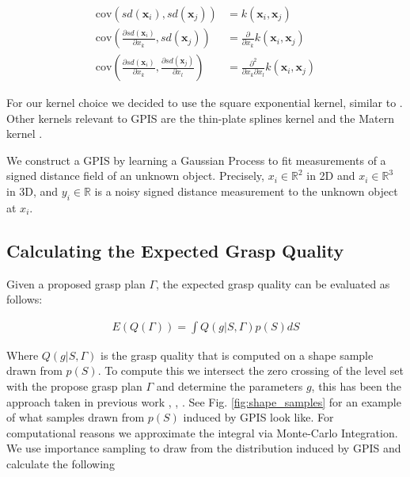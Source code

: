 \documentclass[letterpaper, 10 pt, conference]{ieeeconf}  %
\newcommand{\bx}{\mathbf{x}}
\begin{document}
\vspace{-2ex}
\begin{align}
	\text{cov}\left(sd(\bx_i), sd(\bx_j) \right) &=  k(\bx_i, \bx_j) \\
	\text{cov}\left(\frac{\partial sd (\bx_i)}{\partial x_k}, sd(\bx_j) \right) &= \frac{\partial}{\partial x_k} k(\bx_i, \bx_j) \label{eq:mean_gradient}\\
	\text{cov}\left(\frac{\partial sd (\bx_i)}{\partial x_k}, \frac{\partial sd (\bx_j)}{\partial x_l} \right) &= \frac{\partial^2}{\partial x_k \partial x_l} k(\bx_i, \bx_j)\label{eq:cov_gradient}
\end{align}


For our kernel choice we decided to use the square exponential kernel, similar to \cite{dragiev2011}. Other kernels relevant to GPIS are the thin-plate splines kernel and the Matern kernel \cite{williams2007}. 


We construct a GPIS by learning a Gaussian Process to fit measurements of a signed distance field of an unknown object.  Precisely, $x_i \in \mathbb{R}^2$ in 2D and $x_i \in \mathbb{R}^3$ in 3D, and $y_i \in \mathbb{R}$ is a noisy signed distance measurement to the unknown object at $x_i$.



\subsection{Calculating the Expected Grasp Quality}
Given a proposed grasp plan $\Gamma$, the expected grasp quality can be evaluated as follows:

\vspace{-2ex}
\begin{align}\label{eq:shape_sampling}
E(Q(\Gamma)) = \int Q(g|S,\Gamma) p(S) dS
\end{align}

Where $Q(g|S,\Gamma)$ is the grasp quality that is computed on a shape sample drawn from $p(S)$. To compute this we intersect the zero crossing of the level set with the propose grasp plan $\Gamma$ and determine the parameters $g$, this has been the approach taken in previous work  \cite{kehoe2012estimating}, \cite{kehoe2012toward},  \cite{christopoulos2007handling}. See Fig. \ref{fig:shape_samples} for an example of what samples drawn from $p(S)$ induced by GPIS look like. For computational reasons we approximate the integral via Monte-Carlo Integration. We use importance sampling to draw from the distribution induced by GPIS and calculate the following
\end{document}

